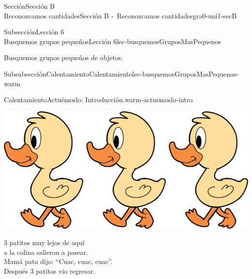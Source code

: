 \begin{sectionptx}{Sección}{{\Large Sección B\\}Reconozcamos cantidades}{}{Sección B -~Reconozcamos cantidades}{}{}{gra0-uni1-secB}
%
%
\typeout{************************************************}
\typeout{************************************************}
%
\begin{subsectionptx}{Subsección}{{\normalsize Lección 6\\[-0.05cm]}Busquemos grupos pequeños}{}{Lección 6}{}{}{lec-busquemosGruposMasPequenos}
\begin{introduction}{}%
Busquemos grupos pequeños de objetos.%
\end{introduction}%
%
%
\typeout{************************************************}
\typeout{************************************************}
%
\begin{subsubsectionptx}{Subsubsección}{Calentamiento}{}{Calentamiento}{}{}{lec-busquemosGruposMasPequenos-warm}
\begin{exploration}{Calentamiento}{Actuémoslo: Introducción.}{warm-actuemoslo-intro}%
\begin{image}{0.1}{0.8}{0.1}{}%
\includegraphics[max width=\linewidth, center]{external/png-source/3 ducks.png}
\end{image}%
\par
3 patitos muy lejos de aquí\\
 a la colina salieron a pasear.\\
 Mamá pata dijo: “Cuac, cuac, cuac”.\\
 Después 3 patitos vio regresar.%
\end{exploration}%
\end{subsubsectionptx}
%
%
\typeout{************************************************}
\typeout{************************************************}

\end{subsectionptx}
\end{sectionptx}
